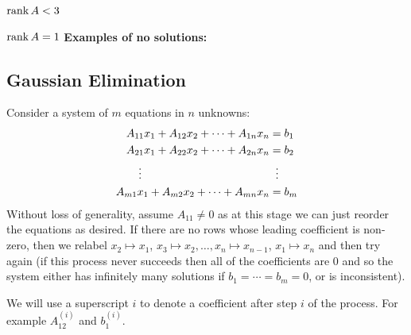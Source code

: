 \documentclass[../main.tex]{subfiles}
\begin{document}
\begin{proofcases}
\begin{case}{$\operatorname{rank} A < 3$}
\begin{proofcases}
\begin{case}{$\operatorname{rank} A = 1$}
        \textbf{Examples of no solutions:}
        \begin{center}
        \end{center}
      \end{case}
    \end{proofcases}
  \end{case}
\end{proofcases}
\subsection{Gaussian Elimination}
Consider a system of $m$ equations in $n$ unknowns:
\begin{align*}
  A_{1 1}x_1 + A_{1 2}x_2 + \cdots + A_{1 n}x_n &= b_1 \\
  A_{2 1}x_1 + A_{2 2}x_2 + \cdots + A_{2 n}x_n &= b_2 \\
  \vdots \hspace{11.5em}&\;\;\vdots \\
  A_{m 1}x_1 + A_{m 2}x_2 + \cdots + A_{m n}x_n &= b_m
\end{align*}
Without loss of generality, assume $A_{1 1} \neq 0$ as at this stage we can just reorder the equations as desired.
If there are no rows whose leading coefficient is non-zero, then we relabel $x_2 \mapsto x_1$, $x_3 \mapsto x_2, \ldots, x_n \mapsto x_{n - 1}$, $x_1 \mapsto x_n$ and then try again (if this process never succeeds then all of the coefficients are 0 and so the system either has infinitely many solutions if $b_1 = \cdots = b_m = 0$, or is inconsistent).
\begin{remark}[Notation]
  We will use a superscript $i$ to denote a coefficient after step $i$ of the process.
  For example $A^{(i)}_{1 2}$ and $b^{(i)}_1$.
\end{remark}
\end{document}
